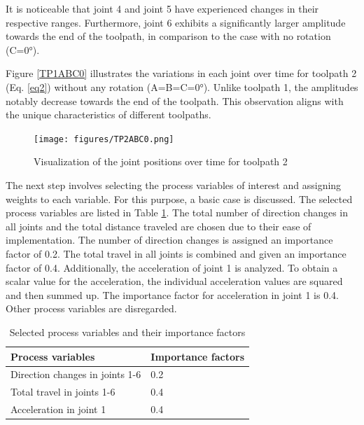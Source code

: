 It is noticeable that joint 4 and joint 5 have experienced changes in their respective ranges. Furthermore, joint 6 exhibits a significantly larger amplitude towards the end of the toolpath, in comparison to the case with no rotation (C=0°).

Figure \ref{TP1ABC0} illustrates the variations in each joint over time for toolpath 2 (Eq. \ref{eq2}) without any rotation (A=B=C=0°). Unlike toolpath 1, the amplitudes notably decrease towards the end of the toolpath. This observation aligns with the unique characteristics of different toolpaths.
 
\begin{figure}[H]
	\centerline{\texttt{[image: figures/TP2ABC0.png]}}
	\caption{Visualization of the joint positions over time for toolpath 2}
	\label{TP2ABC0}
\end{figure}

The next step involves selecting the process variables of interest and assigning weights to each variable. For this purpose, a basic case is discussed. The selected process variables are listed in Table \ref{PPbasic}. The total number of direction changes in all joints and the total distance traveled are chosen due to their ease of implementation. The number of direction changes is assigned an importance factor of 0.2.
The total travel in all joints is combined and given an importance factor of 0.4.
Additionally, the acceleration of joint 1 is analyzed. To obtain a scalar value for the acceleration, the individual acceleration values are squared and then summed up. The importance factor for acceleration in joint 1 is 0.4. Other process variables are disregarded.

\begin{table}[H]
	\centering
	\begin{tabular}{||l|l||}
		Process variables& Importance factors \\
		\hline
		\hline
		\hline
		Direction changes in joints 1-6	&		0.2 \\
		Total travel in joints 1-6	&  	0.4 \\
		Acceleration in joint 1	& 		0.4\\
		
		\hline
		\hline
	\end{tabular}
	
	\caption{Selected process variables and their importance factors}
	\label{PPbasic}
\end{table}


